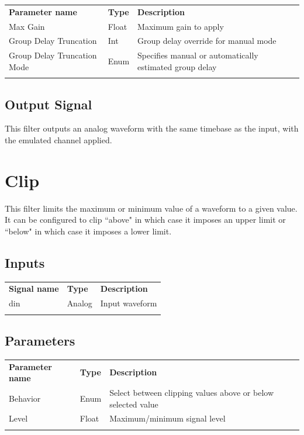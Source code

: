 \begin{tabularx}{16cm}{llX}
\thickhline
\textbf{Parameter name} & \textbf{Type} & \textbf{Description} \\
\thickhline
Max Gain & Float & Maximum gain to apply\\
\thinhline
Group Delay Truncation & Int & Group delay override for manual mode\\
\thinhline
Group Delay Truncation Mode & Enum & Specifies manual or automatically estimated group delay\\
\thickhline
\end{tabularx}

\subsection{Output Signal}

This filter outputs an analog waveform with the same timebase as the input, with the emulated channel applied.

\pagebreak
\section{Clip}
\label{filter:clip}

This filter limits the maximum or minimum value of a waveform to a given value. It can be configured
to clip ``above" in which case it imposes an upper limit or ``below" in which case it imposes a lower
limit.

\subsection{Inputs}

\begin{tabularx}{16cm}{llX}
\thickhline
\textbf{Signal name} & \textbf{Type} & \textbf{Description} \\
\thickhline
din & Analog & Input waveform \\
\thickhline
\end{tabularx}

\subsection{Parameters}

\begin{tabularx}{16cm}{llX}
\thickhline
\textbf{Parameter name} & \textbf{Type} & \textbf{Description} \\
\thickhline
Behavior & Enum & Select between clipping values above or below selected value\\
\thinhline
Level & Float & Maximum/minimum signal level\\
\thickhline
\end{tabularx}

